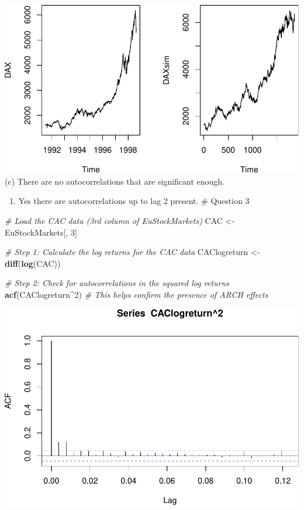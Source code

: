\documentclass[
]{article}
\newenvironment{Shaded}{\begin{snugshade}}{\end{snugshade}}
\newcommand{\CommentTok}[1]{\textcolor[rgb]{0.56,0.35,0.01}{\textit{#1}}}
\newcommand{\DecValTok}[1]{\textcolor[rgb]{0.00,0.00,0.81}{#1}}
\newcommand{\FunctionTok}[1]{\textcolor[rgb]{0.13,0.29,0.53}{\textbf{#1}}}
\newcommand{\NormalTok}[1]{#1}
\newcommand{\OtherTok}[1]{\textcolor[rgb]{0.56,0.35,0.01}{#1}}
\newcommand{\SpecialCharTok}[1]{\textcolor[rgb]{0.81,0.36,0.00}{\textbf{#1}}}
\providecommand{\tightlist}{%
  \setlength{\itemsep}{0pt}\setlength{\parskip}{0pt}}
\begin{document}
\includegraphics{a4_files/figure-latex/unnamed-chunk-2-3.pdf} (c) There
are no autocorrelations that are significant enough.

\begin{enumerate}
\def\labelenumi{(\alph{enumi})}
\setcounter{enumi}{3}
\tightlist
\item
  Yes there are autocorrelations up to lag 2 present. \# Question 3
\end{enumerate}

\begin{Shaded}
\begin{Highlighting}[]
\CommentTok{\# Load the CAC data (3rd column of EuStockMarkets)}
\NormalTok{CAC }\OtherTok{\textless{}{-}}\NormalTok{ EuStockMarkets[, }\DecValTok{3}\NormalTok{]}

\CommentTok{\# Step 1: Calculate the log returns for the CAC data}
\NormalTok{CAClogreturn }\OtherTok{\textless{}{-}} \FunctionTok{diff}\NormalTok{(}\FunctionTok{log}\NormalTok{(CAC))}

\CommentTok{\# Step 2: Check for autocorrelations in the squared log returns}
\FunctionTok{acf}\NormalTok{(CAClogreturn}\SpecialCharTok{\^{}}\DecValTok{2}\NormalTok{) }\CommentTok{\# This helps confirm the presence of ARCH effects}
\end{Highlighting}
\end{Shaded}

\includegraphics{a4_files/figure-latex/unnamed-chunk-3-1.pdf}
\end{document}
